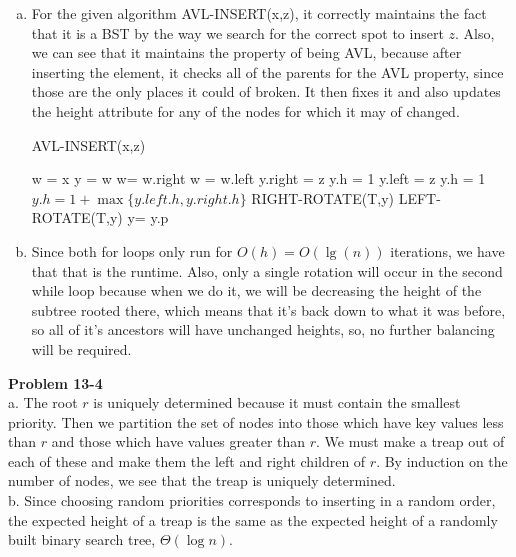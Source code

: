 \documentclass{article}
\begin{document}
\begin{enumerate}[a.]
\item
For the given algorithm AVL-INSERT(x,z), it correctly maintains the fact that it is a BST by the way we search for the correct spot to insert $z$. Also, we can see that it maintains the property of being AVL, because after inserting the element, it checks all of the parents for the AVL property, since those are the only places it could of broken. It then fixes it and also updates the height attribute for any of the nodes for which it may of changed.
\begin{algorithm}
\caption{AVL-INSERT(x,z)}
\begin{algorithmic}
\State w = x
\State y = w
\State w= w.right
\Else
\State w = w.left
\EndIf
\EndWhile
\State
{}
\State y.right = z
\State y.h = 1
\EndIf
\Else
\State y.left = z
\State y.h = 1
\EndIf
\EndIf
{}
\State $y.h = 1 + \max\{y.left.h,y.right.h\}$
\State RIGHT-ROTATE(T,y)
\EndIf
{}
\State LEFT-ROTATE(T,y)
\State y= y.p
\EndIf
\EndWhile
\end{algorithmic}
\end{algorithm}

\item
Since both for loops only run for $O(h) = O(\lg(n))$ iterations, we have that that is the runtime. Also, only a single rotation will occur in the second while loop because when we do it, we will be decreasing the height of the subtree rooted there, which means that it's back down to what it was before, so all of it's ancestors will have unchanged heights, so, no further balancing will be required.


\end{enumerate}


\noindent\textbf{Problem 13-4}\\

a. The root $r$ is uniquely determined because it must contain the smallest priority.  Then we partition the set of nodes into those which have key values less than $r$ and those which have values greater than $r$.  We must make a treap out of each of these and make them the left and right children of $r$.  By induction on the number of nodes, we see that the treap is uniquely determined. \\

b.  Since choosing random priorities corresponds to inserting in a random order, the expected height of a treap is the same as the expected height of a randomly built binary search tree, $\Theta(\log n)$. \\
\end{document}
